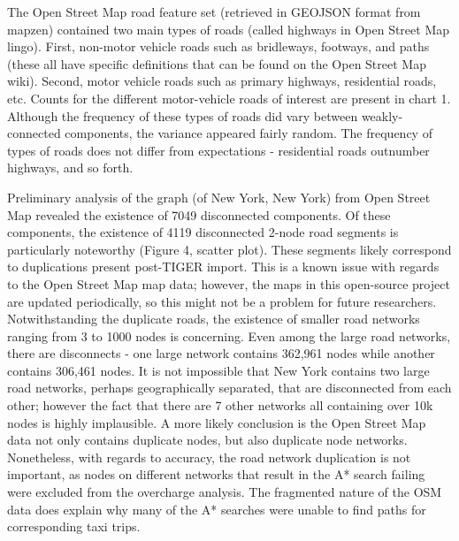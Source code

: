 \documentclass{sig-alternate}
\begin{document}
The Open Street Map road feature set (retrieved in GEOJSON format from mapzen) contained two main types of roads (called highways in Open Street Map lingo). First, non-motor vehicle roads such as bridleways, footways, and paths (these all have specific definitions that can be found on the Open Street Map wiki). Second, motor vehicle roads such as  primary highways, residential roads, etc. Counts for the different motor-vehicle roads of interest are present in chart 1. Although the frequency of these types of roads did vary between weakly-connected components, the variance appeared fairly random. The frequency of types of roads does not differ from expectations - residential roads outnumber highways, and so forth.

Preliminary analysis of the graph (of New York, New York) from Open Street Map revealed the existence of 7049 disconnected components. Of these components, the existence of 4119 disconnected 2-node road segments is particularly noteworthy (Figure 4, scatter plot). These segments likely correspond to duplications present post-TIGER import. This is a known issue with regards to the Open Street Map map data; however, the maps in this open-source project are updated periodically, so this might not be a problem for future researchers. Notwithstanding the duplicate roads, the existence of smaller road networks ranging from 3 to 1000 nodes is concerning. Even among the large road networks, there are disconnects - one large network contains 362,961 nodes while another contains 306,461 nodes. It is not impossible that New York contains two large road networks, perhaps geographically separated, that are disconnected from each other; however the fact that there are 7 other networks all containing over 10k nodes is highly implausible. A more likely conclusion is the Open Street Map data not only contains duplicate nodes, but also duplicate node networks. Nonetheless, with regards to accuracy, the road network duplication is not important, as nodes on different networks that result in the A* search failing were excluded from the overcharge analysis. The fragmented nature of the OSM data does explain why many of the A* searches were unable to find paths for corresponding taxi trips.
\end{document}

